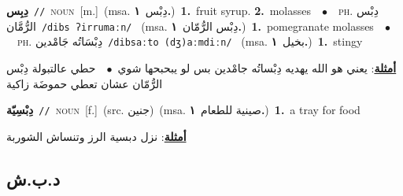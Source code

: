 \documentclass[10pt,a4paper,twoside]{article} %
\begin{document}
\begin{multicols}{2}
{\setlength\topsep{0pt}\textbf{\foreignlanguage{arabic}{دِبِس}}\ {\color{gray}\texttt{//}\color{black}}\ \textsc{noun}\ [m.]\ \color{gray}(msa. \foreignlanguage{arabic}{دِبْس}~\foreignlanguage{arabic}{\textbf{١.}})\color{black}\ \textbf{1.}~fruit syrup.  \textbf{2.}~molasses\ \ $\bullet$\ \ \textsc{ph.} \color{gray} \foreignlanguage{arabic}{دِبْس الرُّمَّان}\color{black}\ {\color{gray}\texttt{/{\sffamily dibs ʔirrumaːn}/}\color{black}}\ \color{gray} (msa. \foreignlanguage{arabic}{دِبْس الرُّمّان}~\foreignlanguage{arabic}{\textbf{١.}})\color{black}\ \textbf{1.}~pomegranate molasses\ \ $\bullet$\ \ \textsc{ph.} \color{gray} \foreignlanguage{arabic}{دِبْسَاتُه جَامْدين}\color{black}\ {\color{gray}\texttt{/{\sffamily dibsaːto (dʒ)aːmdiːn}/}\color{black}}\ \color{gray} (msa. \foreignlanguage{arabic}{بخيل}~\foreignlanguage{arabic}{\textbf{١.}})\color{black}\ \textbf{1.}~stingy\  \begin{flushright}\color{gray}\foreignlanguage{arabic}{\textbf{\underline{\foreignlanguage{arabic}{أمثلة}}}: يعني هو الله يهديه دِبْساتُه جامْدين بس لو يبحبحها شوي\ $\bullet$\ \  حطي عالتبولة دِبْس الرُّمّان عشان تعطي حموضَة زاكية}\end{flushright}\color{black}} \vspace{2mm}

{\setlength\topsep{0pt}\textbf{\foreignlanguage{arabic}{دِبْسِيّة}}\ {\color{gray}\texttt{//}\color{black}}\ \textsc{noun}\ [f.]\ (src. \color{gray}\foreignlanguage{arabic}{جنين}\color{black})\ \color{gray}(msa. \foreignlanguage{arabic}{صينية للطعام}~\foreignlanguage{arabic}{\textbf{١.}})\color{black}\ \textbf{1.}~a tray for food\  \begin{flushright}\color{gray}\foreignlanguage{arabic}{\textbf{\underline{\foreignlanguage{arabic}{أمثلة}}}: نزل دبسية الرز وتنساش الشوربة}\end{flushright}\color{black}} \vspace{2mm}

\vspace{-3mm}
\subsection*{\color{blue}\foreignlanguage{arabic}{د.ب.ش}\color{blue}{}} 


\end{multicols}
\end{document}
